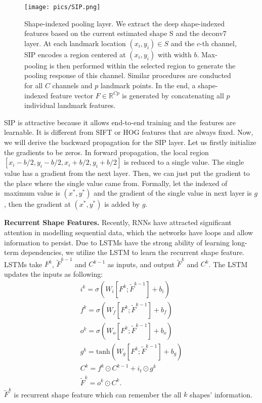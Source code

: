 \documentclass[journal]{IEEEtran}
\begin{document}
\begin{figure}[t]
\center
    \texttt{[image: pics/SIP.png]}
  \caption{Shape-indexed pooling layer. We extract the deep shape-indexed features based on the current estimated shape S and the deconv7 layer. At each landmark location $(x_i,y_i) \in S$ and
the $c$-th channel, SIP encodes a region centered at $(x_i,y_i)$ with width $b$. Max-pooling is then performed within the selected region to generate the pooling response of this channel. Similar procedures are conducted for all $C$ channels and $p$ landmark points. In the end, a shape-indexed feature vector $F \in \mathbb{R}^{Cp}$ is generated by concatenating all $p$ individual landmark features.}
  \label{deep_features}  %
\end{figure}

SIP is attractive because it allows end-to-end training and the features are learnable. It is different from SIFT or HOG features that are always fixed. Now, we will derive the backward propagation for the SIP layer. Let us firstly initialize the gradients to be zeros. In forward propagation, the local region $[x_i-b/2,y_i-b/2, x_i+b/2, y_i+b/2]$ is reduced to a single value. The single value has a gradient from the next layer. Then, we can just put the gradient to the place where the single value came from. Formally, let the indexed of maximum value is $(x^*,y^*)$ and the gradient of the single value in next layer is $g$, then the gradient at $(x^*,y^*)$ is added by $g$. %


\textbf{Recurrent Shape Features.} \label{RSF}
Recently, RNNs have attracted significant attention in modelling sequential data, which the networks have loops and allow information to persist. Due to LSTMs have the strong ability of learning long-term dependencies, we utilize the LSTM to learn the  recurrent shape feature. LSTMs take $F^k$, $\widetilde{F}^{k-1}$ and $C^{k-1}$ as inputs, and output $\widetilde{F}^{k}$ and $C^{k}$. The LSTM updates the inputs as following:
\begin{equation}
\begin{aligned}
 &i^k = \sigma(W_i[F^k;\widetilde{F}^{k-1}] + b_i)& \\
 &f^k = \sigma(W_f[F^k;\widetilde{F}^{k-1}] + b_f)& \\
 &o^k = \sigma(W_o[F^k;\widetilde{F}^{k-1}] + b_o)& \\
 &g^k = \text{tanh}(W_g[F^k;\widetilde{F}^{k-1}] + b_g)&\\
 &C^{k} = f^k \odot C^{k-1} + i_t \odot g^k&\\
 &\widetilde{F}^{k} = o^k \odot C^{k}.&
\end{aligned}
\label{mc}
\end{equation}
$\widetilde{F}^{k}$ is recurrent shape feature which can remember the all $k$ shapes' information.
\end{document}
